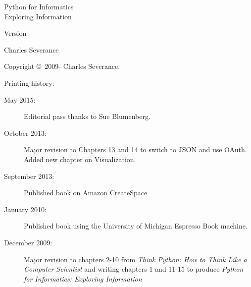 



\newtheorem{ex}{Exercise}[chapter]

\begin{latexonly}

\renewcommand{\blankpage}{\thispagestyle{empty} \quad \newpage}

\thispagestyle{empty}

\begin{flushright}
\vspace*{2.0in}

\begin{spacing}{3}
{\huge Python for Informatics}\\
{\Large Exploring Information}
\end{spacing}

\vspace{0.25in}

Version \theversion

\vspace{0.5in}


{\Large
Charles Severance\\
}

\vfill

\end{flushright}

\pagebreak
\thispagestyle{empty}

{\small
Copyright \copyright ~2009- Charles Severance.


Printing history:

\begin{description}

\item[May 2015:] Editorial pass thanks to Sue Blumenberg.

\item[October 2013:] Major revision to Chapters 13 and 14
to switch to JSON and use OAuth.
Added new chapter on Visualization.

\item[September 2013:] Published book on Amazon CreateSpace

\item[January 2010:] Published book using the University of 
Michigan Espresso Book machine.

\item[December 2009:] Major revision to chapters 2-10 from
\emph{Think Python: How to Think Like
a Computer Scientist}
and writing chapters 1 and 11-15 to
produce 
\emph{Python for Informatics: Exploring Information}


\end{description}}
\end{latexonly}
